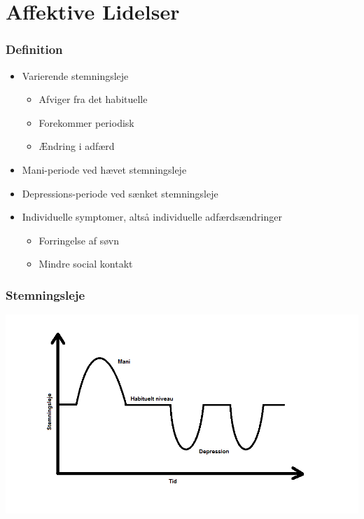 \section{Affektive Lidelser}

\begin{frame}
\frametitle{Definition}

\begin{itemize}
\item Varierende stemningsleje
\begin{itemize}
\item Afviger fra det habituelle
\item Forekommer periodisk
\item Ændring i adfærd
\end{itemize}
\item Mani-periode ved hævet stemningsleje
\item Depressions-periode ved sænket stemningsleje
\item Individuelle symptomer, altså individuelle adfærdsændringer
\begin{itemize}
\item Forringelse af søvn
\item Mindre social kontakt
\end{itemize}
\end{itemize}

\end{frame}

\begin{frame}
\frametitle{Stemningsleje}

\includegraphics[width=\textwidth]{../grafik/affektivstemningsleje.png}

\end{frame}
